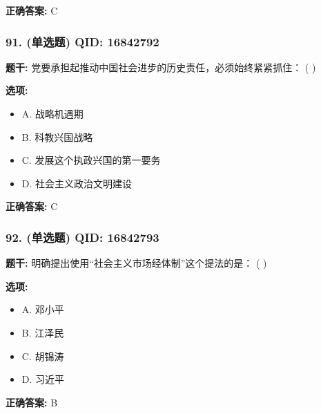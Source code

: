 \documentclass[12pt,UTF8]{ctexart}
\begin{document}
\textbf{正确答案:}
C

\vspace{0.3em}\hrulefill\vspace{0.7em}

\subsubsection*{91. (单选题) \small QID: 16842792}

\textbf{题干:}
党要承担起推动中国社会进步的历史责任，必须始终紧紧抓住： ( )

\textbf{选项:}
\begin{itemize}[leftmargin=*]

  \item A. 战略机遇期

  \item B. 科教兴国战略

  \item C. 发展这个执政兴国的第一要务

  \item D. 社会主义政治文明建设

\end{itemize}

\textbf{正确答案:}
C

\vspace{0.3em}\hrulefill\vspace{0.7em}

\subsubsection*{92. (单选题) \small QID: 16842793}

\textbf{题干:}
明确提出使用“社会主义市场经体制”这个提法的是：  ( )

\textbf{选项:}
\begin{itemize}[leftmargin=*]

  \item A. 邓小平

  \item B. 江泽民

  \item C. 胡锦涛

  \item D. 习近平

\end{itemize}

\textbf{正确答案:}
B

\vspace{0.3em}\hrulefill\vspace{0.7em}
\end{document}
